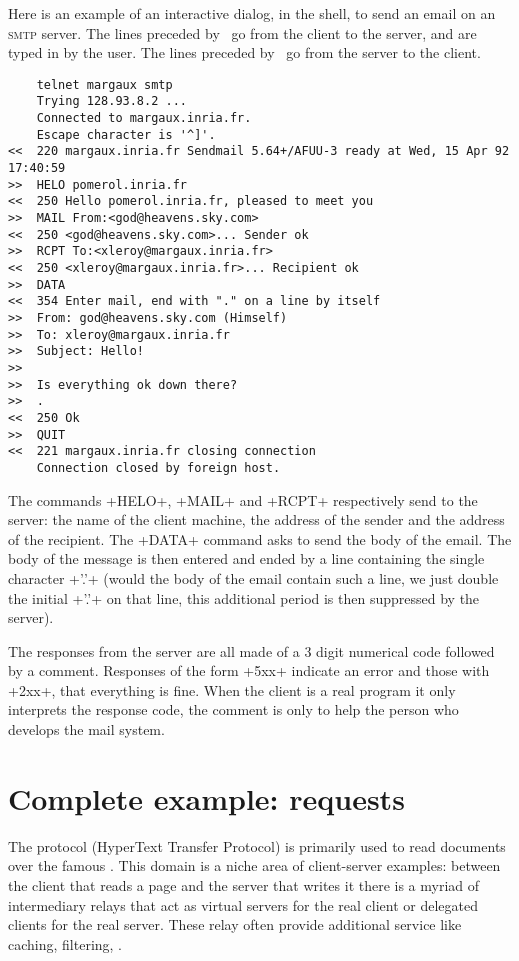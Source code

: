 \begin{example}
Here is an example of an interactive dialog, in the shell, to send an
email on an \textsc{smtp} server. The
lines preceded by~\ifhtmlelse{>>}{$\rightarrow$} go from the client to the
server, and are typed in by the user. The lines preceded
by~\ifhtmlelse{<<}{$\leftarrow$} go from the server to the client.
{
\begin{lstlisting}
    telnet margaux smtp
    Trying 128.93.8.2 ...
    Connected to margaux.inria.fr.
    Escape character is '^]'.
<<  220 margaux.inria.fr Sendmail 5.64+/AFUU-3 ready at Wed, 15 Apr 92 17:40:59
>>  HELO pomerol.inria.fr
<<  250 Hello pomerol.inria.fr, pleased to meet you
>>  MAIL From:<god@heavens.sky.com>
<<  250 <god@heavens.sky.com>... Sender ok
>>  RCPT To:<xleroy@margaux.inria.fr>
<<  250 <xleroy@margaux.inria.fr>... Recipient ok
>>  DATA
<<  354 Enter mail, end with "." on a line by itself
>>  From: god@heavens.sky.com (Himself)
>>  To: xleroy@margaux.inria.fr
>>  Subject: Hello!
>>
>>  Is everything ok down there?
>>  .
<<  250 Ok
>>  QUIT
<<  221 margaux.inria.fr closing connection
    Connection closed by foreign host.
\end{lstlisting}}
The commands \ml+HELO+, \ml+MAIL+ and \ml+RCPT+ respectively send to
the server: the name of the client machine, the address of the sender
and the address of the recipient. The \ml+DATA+ command asks to send
the body of the email. The body of the message is then entered and
ended by a line containing the single character \ml+'.'+ (would the body
of the email contain such a line, we just double the initial \ml+'.'+ on
that line, this additional period is then suppressed by the server). 

The responses from the server are all made of a 3 digit numerical code
followed by a comment. Responses of the form \ml+5xx+ indicate an
error and those with \ml+2xx+, that everything is fine. When the
client is a real program it only interprets the response code, the comment is
only to help the person who develops the mail system.
\end{example}

\section{Complete example: {\normalfont \http} requests}

The {\http} protocol (HyperText Transfer Protocol) is primarily used
to read documents over the famous . This domain
is a niche area of client-server examples: between the client that
reads a page and the server that writes it there is a myriad of
intermediary relays that act as virtual servers for the real client or
delegated clients for the real server. These relay often provide
additional service like caching, filtering, \etc.

